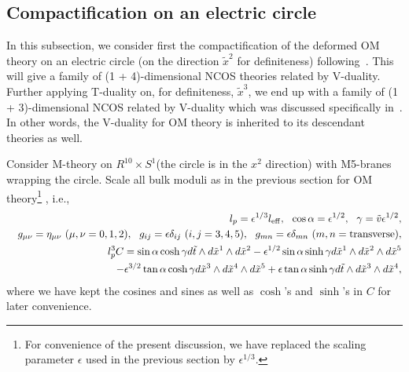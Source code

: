 \documentclass[a4paper,12pt]{article}
\begin{document}
\subsection{Compactification on an electric circle}

In this subsection, we consider first the compactification of the
deformed OM theory on an electric circle (on the direction $\tilde x^2$
for definiteness) following~\cite{Gop2}. This will
give a family of (1 + 4)-dimensional NCOS theories related by V-duality.
Further applying T-duality on, for definiteness, $\tilde x^3$, we end up
with a family of (1 + 3)-dimensional NCOS related by V-duality which was
discussed specifically in~\cite{CW,CLW}. In other words, the V-duality for
OM theory is inherited to its descendant theories as well.

	Consider M-theory on $R^{10} \times S^1$(the circle is in the 
$x^2$ direction) with M5-branes wrapping the circle. Scale all bulk
moduli as in the previous section for OM theory\footnote{For
convenience of the present discussion, we have replaced the scaling
parameter $\epsilon$ used in the previous section by $\epsilon^{1/3}$.}
, i.e.,
\begin{eqnarray}
&&l_p = \epsilon^{1/3} l_{\rm eff}, \ \  \cos\alpha = \epsilon^{1/2}, \
\ \gamma = \tilde v \epsilon^{1/2},\nonumber\\
&&g_{\mu\nu} = \eta_{\mu\nu}~ (\mu,
\nu = 0, 1, 2), \ \ g_{ij} = \epsilon \delta_{ij}~ (i, j = 3, 4, 5),\ \
g_{m n}  = \epsilon \delta_{mn}~ (m, n = {\rm transverse}),\nonumber\\
&& l_p^3C =  \sin\alpha \cosh\gamma d\tilde t\wedge d \tilde x^1 \wedge d\tilde
x^2 - \epsilon^{1/2} \sin\alpha \sinh\gamma d\tilde x^1\wedge d\tilde x^2 
\wedge d\tilde x^5 \nonumber \\
&& ~~~~~ - \epsilon^{3/2} \tan\alpha \cosh\gamma d\tilde x^3 \wedge
d\tilde x^4 \wedge d\tilde x^5 +
    \epsilon \tan\alpha \sinh\gamma d\tilde t \wedge d\tilde x^3 \wedge 
d\tilde x^4, 
\label{eq:comsl}
\end{eqnarray}
where we have kept the cosines and sines as well as $\cosh$'s and
$\sinh$'s in $C$ for later convenience.
\end{document}
